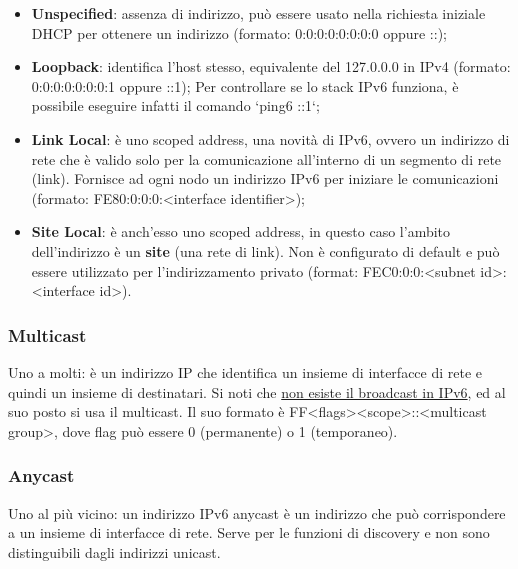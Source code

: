             \begin{itemize}
                \item \textbf{Unspecified}: assenza di indirizzo, può essere usato nella richiesta iniziale DHCP per
                ottenere un indirizzo (formato: 0:0:0:0:0:0:0:0 oppure ::);
                \item \textbf{Loopback}: identifica l’host stesso, equivalente del 127.0.0.0 in IPv4
                (formato: 0:0:0:0:0:0:0:1 oppure ::1); Per controllare se lo stack IPv6 funziona, è
                possibile eseguire infatti il comando `ping6 ::1`;
                \item \textbf{Link Local}: è uno scoped address, una novità di IPv6, ovvero un indirizzo di rete che è
                valido solo per la comunicazione all’interno di un segmento di rete (link).
                Fornisce ad ogni nodo un indirizzo IPv6 per iniziare le comunicazioni
                (formato: FE80:0:0:0:<interface identifier>);
                \item \textbf{Site Local}: è anch’esso uno scoped address, in questo caso l’ambito dell’indirizzo è un
                \textbf{site} (una rete di link). Non è configurato di default e può essere utilizzato per
                l’indirizzamento privato (format: FEC0:0:0:<subnet id>:<interface id>).                
            \end{itemize}
            
        \subsubsection*{Multicast}
            Uno a molti: è un indirizzo IP che identifica un insieme di interfacce di rete e quindi un insieme
            di destinatari. Si noti che \underline{non esiste il broadcast in IPv6}, ed al suo posto si usa il multicast. Il suo
            formato è FF<flags><scope>::<multicast group>, dove flag può essere 0 (permanente) o 1
            (temporaneo).

        \subsubsection*{Anycast}
            Uno al più vicino: un indirizzo IPv6 anycast è un indirizzo che può corrispondere a un insieme
            di interfacce di rete. Serve per le funzioni di discovery e non sono distinguibili dagli indirizzi
            unicast.
            
